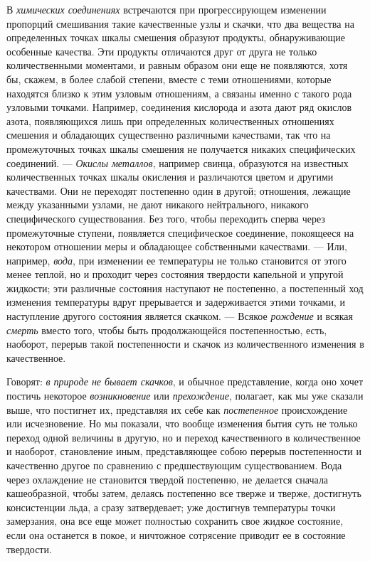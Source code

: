 В {\em химических соединениях} встречаются при
прогрессирующем изменении пропорций смешивания такие качественные узлы и
скачки, что два вещества на определенных точках шкалы смешения образуют
продукты, обнаруживающие особенные качества. Эти продукты отличаются друг
от друга не только количественными моментами, и равным образом они еще не
появляются, хотя бы, скажем, в более слабой степени, вместе с теми
отношениями, которые находятся близко к этим узловым отношениям, а связаны
именно с такого рода узловыми точками. Например, соединения кислорода и
азота дают ряд окислов азота, появляющихся лишь при определенных
количественных отношениях смешения и обладающих существенно различными
качествами, так что на промежуточных точках шкалы смешения не получается
никаких специфических соединений. — {\em Окислы
металлов}, например свинца, образуются на известных количественных точках
шкалы окисления и различаются цветом и другими качествами. Они не переходят
постепенно один в другой; отношения, лежащие между указанными узлами, не
дают никакого нейтрального, никакого специфического существования. Без
того, чтобы переходить сперва через промежуточные ступени, появляется
специфическое соединение, покоящееся на некотором отношении меры и
обладающее собственными качествами. — Или, например,
{\em вода}, при изменении ее температуры не только
становится от этого менее теплой, но и проходит через состояния твердости
капельной и упругой жидкости; эти различные состояния наступают не
постепенно, а постепенный ход изменения температуры вдруг прерывается и
задерживается этими точками, и наступление другого состояния является
скачком. — Всякое {\em рождение} и всякая
{\em смерть} вместо того, чтобы быть продолжающейся
постепенностью, есть, наоборот, перерыв такой постепенности и скачок из
количественного изменения в качественное.

Говорят: {\em в природе не бывает скачков}, и обычное
представление, когда оно хочет постичь некоторое
{\em возникновение} или
{\em прехождение}, полагает, как мы уже сказали выше,
что постигнет их, представляя их себе как
{\em постепенное} происхождение или исчезновение. Но мы
показали, что вообще изменения бытия суть не только переход одной величины
в другую, но и переход качественного в количественное и наоборот,
становление иным, представляющее собою перерыв постепенности и качественно
другое по сравнению с предшествующим существованием. Вода через охлаждение
не становится твердой постепенно, не делается сначала кашеобразной, чтобы
затем, делаясь постепенно все тверже и тверже, достигнуть консистенции
льда, а сразу затвердевает; уже достигнув температуры точки замерзания, она
все еще может полностью сохранить свое жидкое состояние, если она останется
в покое, и ничтожное сотрясение приводит ее в состояние твердости.

